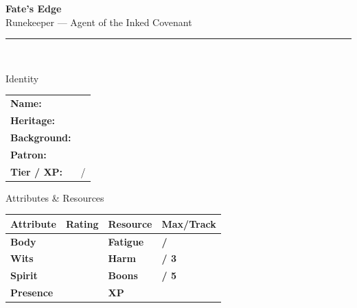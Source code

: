 \documentclass[10pt]{article}
\begin{document}
\begin{center}
    {\Huge\bfseries\sffamily\color{edgered} Fate's Edge}\\[0.2em]
    {\large\sffamily Runekeeper --- Agent of the Inked Covenant}\\[0.5em]
    \rule{0.5\textwidth}{0.5pt}\\[1em]
\end{center}

\begin{minipage}[t]{0.48\linewidth}
    \begin{charbox}{Identity}
        \begin{tabular}{p{2.5cm} p{5cm}}
            \textbf{Name:} & \underline{\hspace{4cm}} \\
            \textbf{Heritage:} & \underline{\hspace{4cm}} \\
            \textbf{Background:} & \underline{\hspace{4cm}} \\
            \textbf{Patron:} & \underline{\hspace{4cm}} \\
            \textbf{Tier / XP:} & \underline{\hspace{2cm}} / \underline{\hspace{2cm}} \\
        \end{tabular}
    \end{charbox}
    
    \vspace{0.5em}
    
    \begin{charbox}{Attributes \& Resources}
        \begin{tabular}{>{\bfseries}p{2.5cm} >{\bfseries}p{1.5cm} >{\bfseries}p{2.5cm} >{\bfseries}p{1.5cm}}
            \toprule
            \textbf{Attribute} & \textbf{Rating} & \textbf{Resource} & \textbf{Max/Track} \\
            \midrule
            Body & \underline{\hspace{1.5cm}} & Fatigue & \underline{\hspace{1.5cm}} / \underline{\hspace{1.5cm}} \\
            Wits & \underline{\hspace{1.5cm}} & Harm & \underline{\hspace{1.5cm}} / 3 \\
            Spirit & \underline{\hspace{1.5cm}} & Boons & \underline{\hspace{1.5cm}} / 5 \\
            Presence & \underline{\hspace{1.5cm}} & XP & \underline{\hspace{1.5cm}} \\
            \bottomrule
        \end{tabular}
    \end{charbox}
    

\end{minipage}
\end{document}
